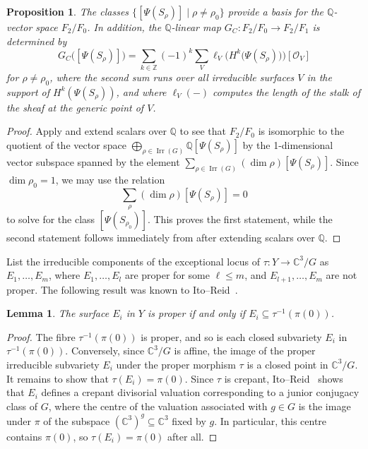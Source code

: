 \documentclass[11pt,reqno]{amsart}
\numberwithin{equation}{section}
\newtheorem{lemma}[theorem]{Lemma}
\newtheorem{proposition}[theorem]{Proposition}
\theoremstyle{definition}
\newcommand{\one}{\ensuremath{(\mathrm{i})}}
\newcommand{\two}{\ensuremath{(\mathrm{ii})}}
\newcommand{\CC}{\ensuremath{\mathbb{C}}}
\newcommand{\QQ}{\ensuremath{\mathbb{Q}}}
\newcommand{\chamber}{C}
\newcommand{\0}{\operatorname{0}}
\newcommand{\Irr}{\operatorname{Irr}}
\begin{document}
   \begin{proposition}
   \label{prop:GaleDual}
  The classes $\{[\Psi(S_\rho)] \mid \rho\neq \rho_0\}$ provide a basis for the $\QQ$-vector space $F_2/F_0$. In addition, the $\QQ$-linear map $G_C\colon F_2/F_0 \to F_2/F_1$ is determined by  \begin{equation}
     \label{eqn:GCintro}
G_{\chamber}\big([\Psi(S_\rho)]\big) = \sum_{k\in \mathbb{Z}} (-1)^{k}\sum_{V} \ell_V\big(H^k\big(\Psi(S_\rho)\big)\big)[\mathcal{O}_{V}] 
 \end{equation}
  for $\rho\neq \rho_0$, where the second sum runs over all irreducible surfaces $V$ in the support of $H^k(\Psi(S_\rho))$, and where $\ell_V(-)$ computes the length of the stalk of the sheaf at the generic point of $V$.   \end{proposition}
  \begin{proof}
 Apply \cite[Theorem~1.1\one]{C21} and extend scalars over $\QQ$ to see that $F_2/F_0$ is isomorphic to the quotient of the vector space $\bigoplus_{\rho\in \Irr(G)} \QQ[\Psi(S_\rho)]$ by the 1-dimensional vector subspace spanned by the element $\sum_{\rho\in \Irr(G)} (\dim\rho) [\Psi(S_\rho)]$. Since $\dim \rho_0=1$, we may use the relation 
 \[
 \sum_\rho (\dim \rho) [\Psi(S_\rho)]=0
 \]
 to solve for the class $[\Psi(S_{\rho_0})]$.  This proves the first statement, while the second statement follows immediately from \cite[Theorem~1.1\two]{C21} after extending scalars over $\QQ$.
  \end{proof}

  List the irreducible components of the exceptional locus of  $\tau\colon Y\to \mathbb{C}^3/G$ as $E_1, \dots, E_m$, where $E_1, \dots, E_l$ are proper for some $\ell\leq m$, and $E_{l+1}, \dots , E_m$ are not proper. The following result was known to Ito--Reid~\cite[(2.10)]{IR96}.
  
  \begin{lemma}
 The surface $E_i$ in $Y$ is proper if and only if $E_i\subseteq \tau^{-1}(\pi(0))$.
  \end{lemma}
  \begin{proof}
  The fibre $\tau^{-1}(\pi(0))$ is proper, and so is each closed subvariety $E_i$ in $\tau^{-1}(\pi(0))$. Conversely, since $\mathbb{C}^3/G$ is affine, the image of the proper irreducible subvariety $E_i$ under the proper morphism $\tau$ is a closed point in $\CC^3/G$. It remains to show that $\tau(E_i)=\pi(0)$. Since $\tau$ is crepant, Ito--Reid~\cite{IR96} shows that $E_i$ defines a crepant divisorial valuation corresponding to a junior conjugacy class of $G$, where the centre of the valuation associated with $g\in G$ is the image under $\pi$ of the subspace $(\mathbb{C}^3)^g\subseteq \CC^3$ fixed by $g$. In particular, this centre contains $\pi(0)$, so $\tau(E_i)=\pi(0)$ after all.
  \end{proof} 
  
\end{document}

